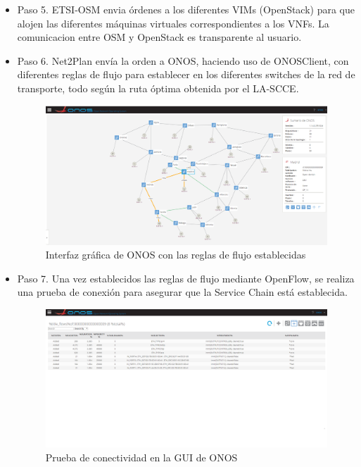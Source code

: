 \begin{itemize}
	
	\item Paso 5. ETSI-OSM envia órdenes a los diferentes VIMs (OpenStack) para que alojen las diferentes máquinas virtuales correspondientes a los VNFs. La comunicacion entre OSM y OpenStack es transparente al usuario.
	
	\item Paso 6. Net2Plan envía la orden a ONOS, haciendo uso de ONOSClient, con diferentes reglas de flujo para establecer en los diferentes switches de la red de transporte, todo según la ruta óptima obtenida por el LA-SCCE.
	
	\begin{figure}[!ht]
		\centering
		\includegraphics[width=0.7\linewidth]{imagenes/topo_onos}
		\caption{Interfaz gráfica de ONOS con las reglas de flujo establecidas}
		\label{fig:topo_onos}
	\end{figure}

	\clearpage

	\item Paso 7. Una vez establecidos las reglas de flujo mediante OpenFlow, se realiza una prueba de conexión para asegurar que la Service Chain está establecida.
	
	\begin{figure}[!ht]
		\centering
		\includegraphics[width=0.7\linewidth]{imagenes/onos_flowrules}
		\caption{Prueba de conectividad en la GUI de ONOS}
		\label{fig:onosflowrules}
	\end{figure}


\end{itemize}

